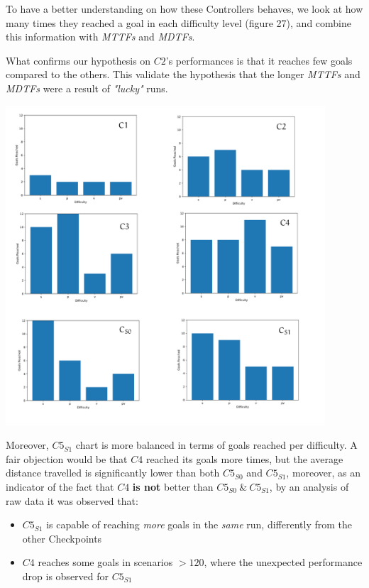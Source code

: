 To have a better understanding on how these Controllers behaves, we look at how many times they reached a goal in each difficulty level (figure 27), and combine this information with \textsl{MTTFs} and \textsl{MDTFs}.

What confirms our hypothesis on $C2$'s performances is that it reaches few goals compared to the others. This validate the hypothesis that the longer \textsl{MTTFs} and \textsl{MDTFs} were a result of \textsl{"lucky"} runs.

\vspace{1cm}

\begin{minipage}[c]{450px}
	\includegraphics[width=450px,height=450px]{img/goals.png}
\end{minipage}
\newpage

Moreover, $C5_{S1}$ chart is more balanced in terms of goals reached per difficulty. A fair objection would be that $C4$ reached its goals more times, but the average distance travelled is significantly lower than both $C5_{S0}$ and $C5_{S1}$, moreover, as an indicator of the fact that $C4$ \textbf{is not} better than $C5_{S0}\: \&\: C5_{S1}$, by an analysis of raw data it was observed that:

\begin{itemize}
	\item $C5_{S1}$ is capable of reaching \textsl{more} goals in the \textsl{same} run, differently from the other Checkpoints
	\item $C4$ reaches some goals in scenarios $> 120$, where the unexpected performance drop is observed for $C5_{S1}$
\end{itemize}

